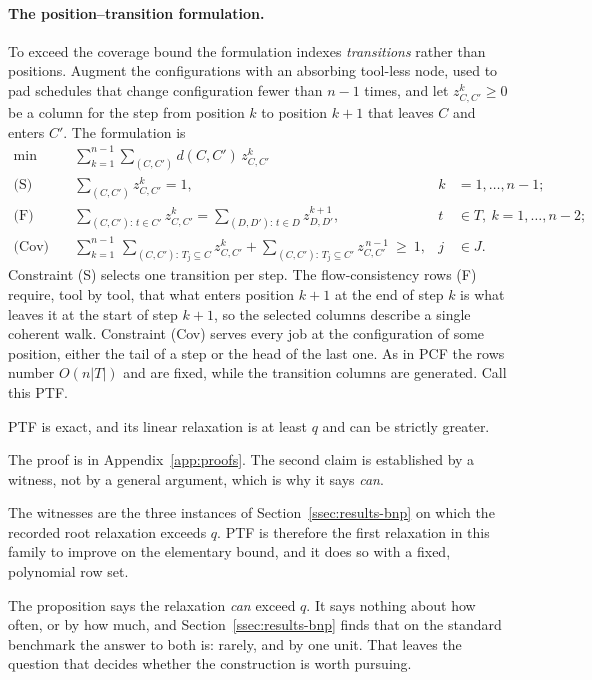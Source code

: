 \paragraph{The position--transition formulation.}
To exceed the coverage bound the formulation indexes \emph{transitions} rather than
positions. Augment the configurations with an absorbing tool-less node, used to pad
schedules that change configuration fewer than $n-1$ times, and let
$z_{C,C'}^{k}\ge0$ be a column for the step from position $k$ to position $k+1$ that
leaves $C$ and enters $C'$. The formulation is
\[
\begin{aligned}
  \min\ & \sum_{k=1}^{n-1}\sum_{(C,C')} d(C,C')\,z_{C,C'}^{k}\\
  \text{(S)}\quad & \sum_{(C,C')} z_{C,C'}^{k}=1, & k&=1,\dots,n-1;\\
  \text{(F)}\quad & \sum_{(C,C'):\,t\in C'} z_{C,C'}^{k}
                    =\sum_{(D,D'):\,t\in D} z_{D,D'}^{k+1}, & t&\in T,\ k=1,\dots,n-2;\\
  \text{(Cov)}\quad & \sum_{k=1}^{n-1}\,\sum_{(C,C'):\,T_j\subseteq C} z_{C,C'}^{k}
                    +\!\!\sum_{(C,C'):\,T_j\subseteq C'} z_{C,C'}^{\,n-1}\ \ge\ 1,
                    & j&\in J.
\end{aligned}
\]
Constraint (S) selects one transition per step. The flow-consistency rows (F) require,
tool by tool, that what enters position $k+1$ at the end of step $k$ is what leaves it
at the start of step $k+1$, so the selected columns describe a single coherent walk.
Constraint (Cov) serves every job at the configuration of some position, either the
tail of a step or the head of the last one. As in PCF the rows number
$O(n\lvert T\rvert)$ and are fixed, while the transition columns are generated. Call
this PTF.

\begin{proposition}\label{prop:ptf}
PTF is exact, and its linear relaxation is at least $q$ and can be strictly greater.
\end{proposition}

The proof is in Appendix~\ref{app:proofs}. The second claim is established by a
witness, not by a general argument, which is why it says \emph{can}.

The witnesses are the three instances of Section~\ref{ssec:results-bnp} on which the
recorded root relaxation exceeds $q$. PTF is therefore the first relaxation in this
family to improve on the elementary bound, and it does so with a fixed, polynomial row
set.

The proposition says the relaxation \emph{can} exceed $q$. It says nothing about how
often, or by how much, and Section~\ref{ssec:results-bnp} finds that on the standard
benchmark the answer to both is: rarely, and by one unit. That leaves the question that
decides whether the construction is worth pursuing.

